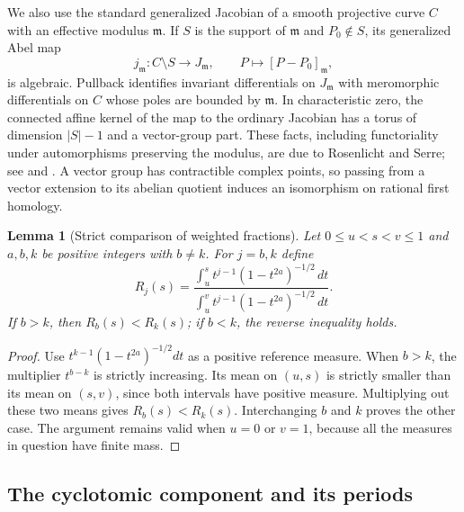 \documentclass[11pt,a4paper]{article}
\newtheorem{lemma}[theorem]{Lemma}
\theoremstyle{definition}
\theoremstyle{remark}
\numberwithin{equation}{section}
\begin{document}
We also use the standard generalized Jacobian of a smooth projective
curve $C$ with an effective modulus $\mathfrak m$.  If $S$ is the support
of $\mathfrak m$ and $P_0\notin S$, its generalized Abel map
\[
 j_{\mathfrak m}:C\setminus S\longrightarrow J_{\mathfrak m},
 \qquad P\longmapsto[P-P_0]_{\mathfrak m},
\]
is algebraic.  Pullback identifies invariant differentials on
$J_{\mathfrak m}$ with meromorphic differentials on $C$ whose poles are
bounded by $\mathfrak m$.  In characteristic zero, the connected affine
kernel of the map to the ordinary Jacobian has a torus of dimension
$|S|-1$ and a vector-group part.  These facts, including functoriality
under automorphisms preserving the modulus, are due to
Rosenlicht and Serre; see \cite{bs-rosenlicht} and
\cite[Chapter~V]{bs-serre}.  A vector group has contractible complex
points, so passing from a vector extension to its abelian quotient
induces an isomorphism on rational first homology.

\begin{lemma}[Strict comparison of weighted fractions]
\label{bs-monotonicity}
Let $0\le u<s<v\le1$ and $a,b,k$ be positive integers with $b\ne k$.
For $j=b,k$ define
\[
 R_j(s)=
 \frac{\displaystyle\int_u^s
                 t^{j-1}(1-t^{2a})^{-1/2}\,dt}
      {\displaystyle\int_u^v
                 t^{j-1}(1-t^{2a})^{-1/2}\,dt}.
\]
If $b>k$, then $R_b(s)<R_k(s)$; if $b<k$, the reverse inequality holds.
\end{lemma}

\begin{proof}
Use $t^{k-1}(1-t^{2a})^{-1/2}dt$ as a positive reference measure.
When $b>k$, the multiplier $t^{b-k}$ is strictly increasing.  Its mean
on $(u,s)$ is strictly smaller than its mean on $(s,v)$, since both
intervals have positive measure.  Multiplying out these two means gives
$R_b(s)<R_k(s)$.  Interchanging $b$ and $k$ proves the other case.
The argument remains valid when $u=0$ or $v=1$, because all the measures
in question have finite mass.
\end{proof}

\subsection{The cyclotomic component and its periods}
\end{document}

